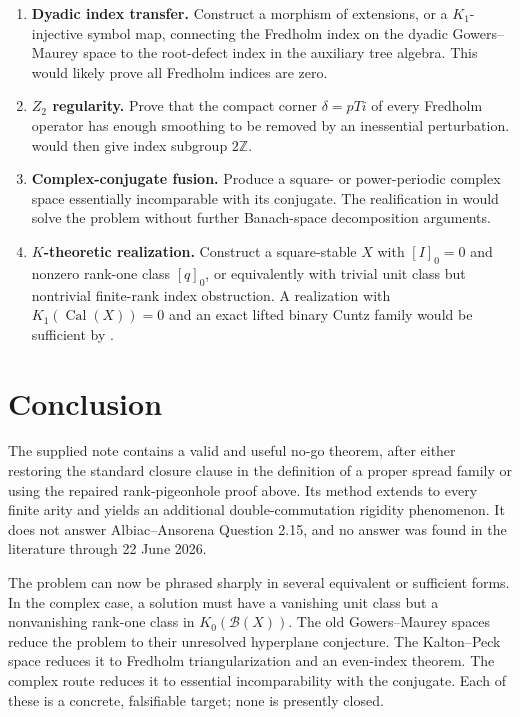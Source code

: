 \documentclass[11pt]{article}
\theoremstyle{definition}
\theoremstyle{remark}
\newcommand{\Z}{\mathbb Z}
\newcommand{\B}{\mathcal B}
\newcommand{\Cal}{\operatorname{Cal}}
\begin{document}
\begin{enumerate}[label=\textbf{\arabic*.},leftmargin=2.2em]
\item \textbf{Dyadic index transfer.}  Construct a morphism of extensions, or a
$K_1$-injective symbol map, connecting the Fredholm index on the dyadic
Gowers--Maurey space to the root-defect index in the auxiliary tree algebra.
This would likely prove all Fredholm indices are zero.

\item \textbf{$Z_2$ regularity.}  Prove that the compact corner
$\delta=pTi$ of every Fredholm operator has enough smoothing to be removed by an
inessential perturbation.   would then give index subgroup
$2\Z$.

\item \textbf{Complex-conjugate fusion.}  Produce a square- or power-periodic
complex space essentially incomparable with its conjugate.  The realification
in  would solve the problem without
further Banach-space decomposition arguments.

\item \textbf{$K$-theoretic realization.}  Construct a square-stable $X$ with
$[I]_0=0$ and nonzero rank-one class $[q]_0$, or equivalently with trivial unit
class but nontrivial finite-rank index obstruction.  A realization with
$K_1(\Cal(X))=0$ and an exact lifted binary Cuntz family would be sufficient by
.
\end{enumerate}

\section{Conclusion}

The supplied note contains a valid and useful no-go theorem, after either
restoring the standard closure clause in the definition of a proper spread
family or using the repaired rank-pigeonhole proof above.  Its method extends
to every finite arity and yields an additional double-commutation rigidity
phenomenon.  It does not answer Albiac--Ansorena Question 2.15, and no answer was
found in the literature through 22 June 2026.

The problem can now be phrased sharply in several equivalent or sufficient
forms.  In the complex case, a solution must have a vanishing unit class but a
nonvanishing rank-one class in $K_0(\B(X))$.  The old Gowers--Maurey spaces
reduce the problem to their unresolved hyperplane conjecture.  The Kalton--Peck
space reduces it to Fredholm triangularization and an even-index theorem.  The
complex route reduces it to essential incomparability with the conjugate.  Each
of these is a concrete, falsifiable target; none is presently closed.
\end{document}
